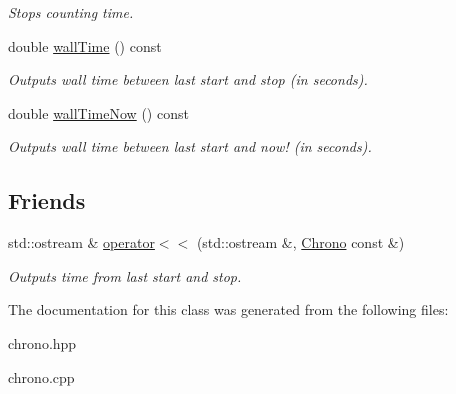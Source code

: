 \begin{DoxyCompactItemize}
\begin{DoxyCompactList}\small\item\em Stops counting time. \item\end{DoxyCompactList}\item 
\hypertarget{classTimings_1_1Chrono_a7072889b8af30d030d9c2ecfd2770771}{
double \hyperlink{classTimings_1_1Chrono_a7072889b8af30d030d9c2ecfd2770771}{wallTime} () const }
\label{classTimings_1_1Chrono_a7072889b8af30d030d9c2ecfd2770771}

\begin{DoxyCompactList}\small\item\em Outputs wall time between last start and stop (in seconds). \item\end{DoxyCompactList}\item 
\hypertarget{classTimings_1_1Chrono_a85a7c55297dd9eefde2487b0ec5e8c1c}{
double \hyperlink{classTimings_1_1Chrono_a85a7c55297dd9eefde2487b0ec5e8c1c}{wallTimeNow} () const }
\label{classTimings_1_1Chrono_a85a7c55297dd9eefde2487b0ec5e8c1c}

\begin{DoxyCompactList}\small\item\em Outputs wall time between last start and now! (in seconds). \item\end{DoxyCompactList}\end{DoxyCompactItemize}
\subsection*{Friends}
\begin{DoxyCompactItemize}
\item 
\hypertarget{classTimings_1_1Chrono_a2b517387193dba843d6ce9a05250a070}{
std::ostream \& \hyperlink{classTimings_1_1Chrono_a2b517387193dba843d6ce9a05250a070}{operator$<$$<$} (std::ostream \&, \hyperlink{classTimings_1_1Chrono}{Chrono} const \&)}
\label{classTimings_1_1Chrono_a2b517387193dba843d6ce9a05250a070}

\begin{DoxyCompactList}\small\item\em Outputs time from last start and stop. \item\end{DoxyCompactList}\end{DoxyCompactItemize}


The documentation for this class was generated from the following files:\begin{DoxyCompactItemize}
\item 
chrono.hpp\item 
chrono.cpp\end{DoxyCompactItemize}
